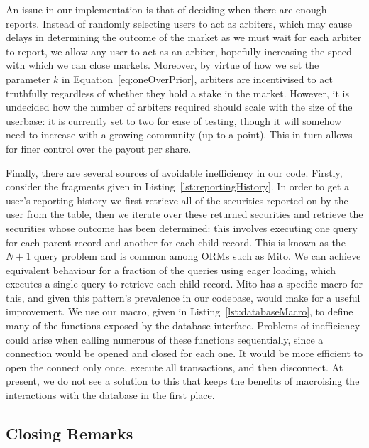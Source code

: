 An issue in our implementation is that of deciding when there are enough
reports. Instead of randomly selecting users to act as arbiters, which may
cause delays in determining the outcome of the market as we must wait for each
arbiter to report, we allow any user to act as an arbiter, hopefully increasing
the speed with which we can close markets. Moreover, by virtue of how we set
the parameter $k$ in Equation~\ref{eq:oneOverPrior}, arbiters are incentivised
to act truthfully regardless of whether they hold a stake in the market.
However, it is undecided how the number of arbiters required should
scale with the size of the userbase: it is currently set to two for ease of
testing, though it will somehow need to increase with a growing community (up
to a point). This in turn allows for finer control over the payout per share.

Finally, there are several sources of avoidable inefficiency in our code.
Firstly, consider the fragments given in Listing~\ref{lst:reportingHistory}.
In order to get a user's reporting history we first retrieve all of the
securities reported on by the user from the  table, then we
iterate over these returned securities and retrieve the securities whose
outcome has been determined: this involves executing one query for each parent
record and another for each child record. This is known as the $N+1$ query
problem and is common among ORMs such as Mito. We can achieve equivalent
behaviour for a fraction of the queries using eager loading, which executes a
single query to retrieve each child record. Mito has a specific macro for this,
and given this pattern's prevalence in our codebase, would make for a useful
improvement. We use our  macro, given in
Listing~\ref{lst:databaseMacro}, to define many of the functions exposed by the
database interface. Problems of inefficiency could arise when calling numerous
of these functions sequentially, since a connection would be opened and closed
for each one. It would be more efficient to open the connect only once, execute
all transactions, and then disconnect. At present, we do not see a solution to
this that keeps the benefits of macroising the interactions with the database
in the first place.

\subsection{Closing Remarks}

